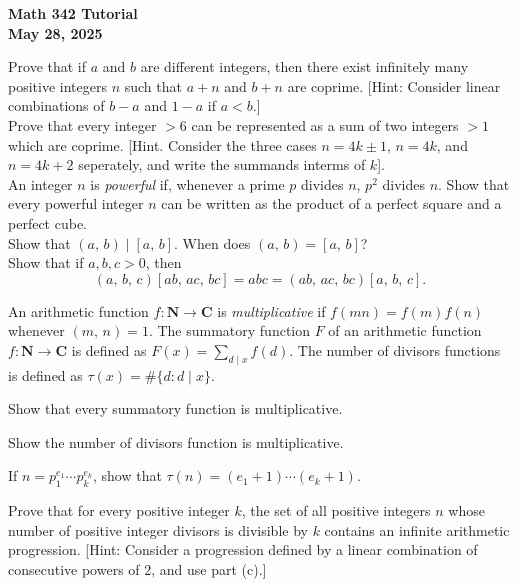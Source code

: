 \documentclass[a4paper,11pt]{article}
\theoremstyle{mythm}
\theoremstyle{mydef}
\newcommand{\C}{\mathbf{C}}
\newcommand{\N}{\mathbf{N}}
\begin{document}
\begin{center}
  {\Large\bfseries Math 342 Tutorial} \\
  {\normalsize\bf May 28, 2025}
\end{center}

 Prove that if $a$ and $b$ are different integers,
then there exist infinitely many positive integers $n$ such that $a+n$ and $b+n$
are coprime. [Hint: Consider linear combinations of $b-a$ and $1-a$ if $a<b$.] \\

 Prove that every integer $>6$ can be represented as a
sum of two integers $>1$ which are coprime. [Hint. Consider the three cases
$n=4k \pm 1$, $n=4k$, and $n=4k+2$ seperately, and write the summands interms of
$k$]. \\

 An integer $n$ is {\it powerful} if, whenever a prime
$p$ divides $n$, $p^2$ divides $n$. Show that every powerful integer $n$ can be
written as the product of a perfect square and a perfect cube. \\

 Show that $(a,\,b) \mid [a,\,b]$. When does
$(a,\,b)=[a,\,b]$?  \\

 Show that if $a,b,c > 0$, then
\[
  (a,\,b,\,c)[ab,\,ac,\,bc] = abc = (ab,\,ac,\,bc)[a,\,b,\,c].
\]

 An arithmetic function $f: \N\rightarrow\C$ is {\it
  multiplicative} if $f(mn)=f(m)f(n)$ whenever $(m,\,n)=1$. The summatory
function $F$ of an arithmetic function $f:\N\rightarrow\C$ is defined as
$F(x)=\sum_{d \mid x}f(d)$. The number of divisors functions is defined as
$\tau(x)=\#\{d : d \mid x\}$.
\begin{enumerate*}[{\bf (a)}]
\item Show that every summatory function is multiplicative.
\item Show the number of divisors function is multiplicative.
\item If $n=p_1^{e_1}\cdots p_k^{e_k}$, show that $\tau(n)=(e_1+1) \cdots (e_k+1)$.
\item Prove that for every positive integer $k$, the set of all positive
  integers $n$ whose number of positive integer divisors is divisible by $k$
  contains an infinite arithmetic progression. [Hint: Consider a progression
  defined by a linear combination of consecutive powers of 2, and use part (c).]\\
\end{enumerate*}
\end{document}
